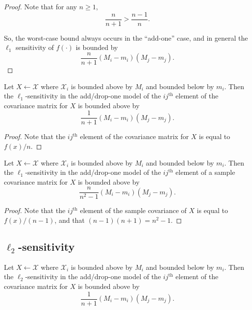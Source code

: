 \documentclass[11pt]{scrartcl} %
\begin{document}
\begin{proof}
Note that for any $n \ge 1$,
	\begin{equation}
	\label{ineq}
	 \frac{n}{n + 1} > \frac{n-1}{n}.
	\end{equation}

So, the worst-case bound always occurs in the ``add-one'' case, and in general the  $\ell_1$ sensitivity of $f(\cdot)$ is bounded by
 $$ \frac{n}{n+1}  (M_i - m_i)(M_j - m_j).$$ 
\end{proof}

\begin{corollary}
\label{cor:renorm}
Let $X \leftarrow \mathcal{X}$ where $\mathcal{X}_i$ is bounded above by $M_i$ and bounded below by $m_i$. Then the $\ell_1$-sensitivity in the add/drop-one model of the $ij^{\text{th}}$ element of the covariance matrix for $X$ is bounded above by 
$$ \frac{1}{n+1}(M_i - m_i)(M_j - m_j).$$
\end{corollary}

\begin{proof}
Note that the $ij^{\text{th}}$ element of the covariance matrix for $X$ is equal to $f(x)/n$.
\end{proof}

\begin{corollary}
\label{cor:renorm}
Let $X \leftarrow \mathcal{X}$ where $\mathcal{X}_i$ is bounded above by $M_i$ and bounded below by $m_i$. Then the $\ell_1$-sensitivity in the add/drop-one model of the $ij^{\text{th}}$ element of a sample covariance matrix for $X$ is bounded above by 
$$ \frac{n}{n^2-1}(M_i - m_i)(M_j - m_j).$$
\end{corollary}

\begin{proof}
Note that the $ij^{\text{th}}$ element of the sample covariance of $X$ is equal to $f(x)/(n-1)$, and that $(n-1)(n+1) = n^2 -1$.
\end{proof}

\subsection{$\ell_2$-sensitivity}

\begin{theorem}
Let $X \leftarrow \mathcal{X}$ where $\mathcal{X}_i$ is bounded above by $M_i$ and bounded below by $m_i$. Then the $\ell_2$-sensitivity in the add/drop-one model of the $ij^{\text{th}}$ element of the covariance matrix for $X$ is bounded above by
$$ \frac{1}{n+1}(M_i - m_i)(M_j - m_j).$$
\end{theorem}
\end{document}
